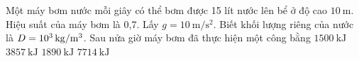 \begin{ex}
	Một máy bơm nước mỗi giây có thể bơm được 15 lít nước lên bể ở độ cao $\SI{10}{\meter}$. Hiệu suất của máy bơm là 0,7. Lấy $g=\SI{10}{\meter/\second^2}$. Biết khối lượng riêng của nước là  $D=\SI{E3}{\kilogram/\meter^3}$. Sau nửa giờ máy bơm đã thực hiện một công bằng	
	\choice
	{$\SI{1500}{\kilo\joule}$}
	{\True $\SI{3857}{\kilo\joule}$}
	{$\SI{1890}{\kilo\joule}$}
	{$\SI{7714}{\kilo\joule}$}
\end{ex}
